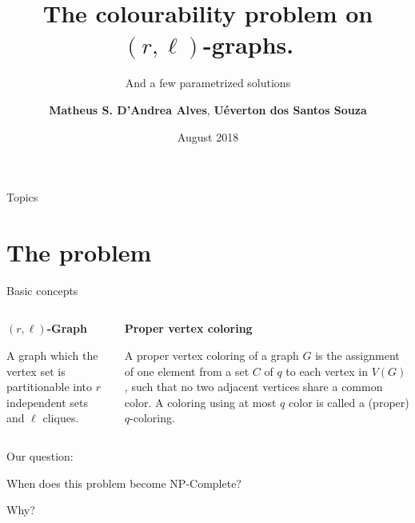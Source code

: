 \documentclass[9pt, compress]{beamer}
\author{\textbf{Matheus S. D'Andrea Alves}, \textbf{Uéverton dos Santos Souza} }
\title{The colourability problem on $(r,\ell)$-graphs.}
\subtitle{And a few parametrized solutions}
\date{August 2018}
\newcommand{\?}{\textcolor{warn}{\textit{?}}}
\begin{document}
    \maketitle
    \begin{frame}{Topics}
    \centering
        \tableofcontents
    \end{frame}
    \section{The problem}
    \begin{frame}{Basic concepts}
      \begin{columns}
        \begin{column}{0.5\textwidth}
          \textbf{$(r,\ell)$-Graph}
          
          A graph which the vertex set is partitionable into $r$ independent sets and $\ell$ cliques.
        \end{column}
        \begin{column}{0.5\textwidth}
          \textbf{Proper vertex coloring}
          
          A proper vertex coloring of a graph $G$ is the assignment of one element from a set $C$ of $q$ to each vertex in $V(G)$, such that no two adjacent vertices share a common color. A coloring using at most $q$ color is called a (proper) $q$-coloring.
        \end{column}
      \end{columns}
    \end{frame}
    \begin{frame}[standout]
      Our question:
      
      When does this problem become NP-Complete? 
      
      Why?
    \end{frame}
\end{document}
